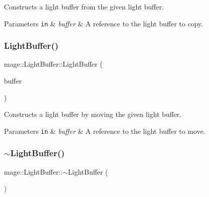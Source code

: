 Constructs a light buffer from the given light buffer.


\begin{DoxyParams}[1]{Parameters}
\mbox{\tt in}  & {\em buffer} & A reference to the light buffer to copy. \\
\hline
\end{DoxyParams}
\hypertarget{structmage_1_1_light_buffer_af0bb4f34aebc13b8cbd81e26fb8f6ecf}{}\label{structmage_1_1_light_buffer_af0bb4f34aebc13b8cbd81e26fb8f6ecf} 
\subsubsection{\texorpdfstring{Light\+Buffer()}{LightBuffer()}\hspace{0.1cm}{\footnotesize\ttfamily [3/3]}}
{\footnotesize\ttfamily mage\+::\+Light\+Buffer\+::\+Light\+Buffer (\begin{DoxyParamCaption}\item[{\hyperlink{structmage_1_1_light_buffer}{Light\+Buffer} \&\&}]{buffer }\end{DoxyParamCaption})\hspace{0.3cm}{\ttfamily [default]}}

Constructs a light buffer by moving the given light buffer.


\begin{DoxyParams}[1]{Parameters}
\mbox{\tt in}  & {\em buffer} & A reference to the light buffer to move. \\
\hline
\end{DoxyParams}
\hypertarget{structmage_1_1_light_buffer_a0dc88c8ad1721b4b545c65c26c2fec69}{}\label{structmage_1_1_light_buffer_a0dc88c8ad1721b4b545c65c26c2fec69} 
\subsubsection{\texorpdfstring{$\sim$\+Light\+Buffer()}{~LightBuffer()}}
{\footnotesize\ttfamily mage\+::\+Light\+Buffer\+::$\sim$\+Light\+Buffer (\begin{DoxyParamCaption}{ }\end{DoxyParamCaption})\hspace{0.3cm}{\ttfamily [default]}}


